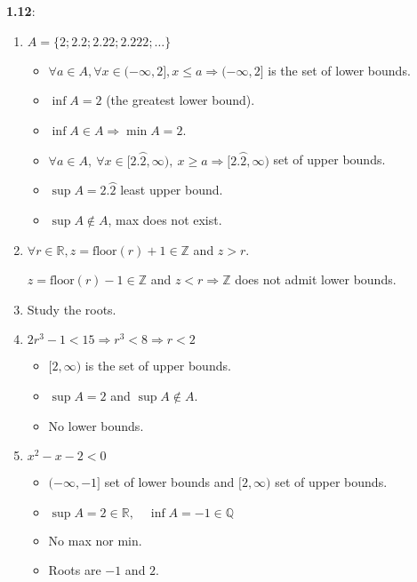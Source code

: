 \documentclass[12pt, a4paper]{book}
\begin{document}
\textbf{1.12}:
\begin{enumerate}[label=\emph{\alph*})]
  \item $A = \{2;2.2;2.22;2.222;\ldots\}$
  \begin{itemize}
    \item $\forall a\in A, \forall x\in(-\infty,2], x\leq a \Rightarrow (-\infty, 2]$ is the set of lower bounds.
    \item $\inf A=2$ (the greatest lower bound).
    \item $\inf A \in A \Rightarrow \min A = 2$.
    \item $\forall a\in A,\ \forall x\in [2.\wideparen{2}, \infty),\ x\geq a \Rightarrow [2.\wideparen{2}, \infty)$ set of upper bounds.
    \item $\sup A = 2.\wideparen{2}$ least upper bound.
    \item $\sup A \notin A$, max does not exist.
  \end{itemize}
  \item $\forall r\in\mathbb{R}, z=\text{floor}(r)+1 \in\mathbb{Z}$ and $z>r$.

  $z=\text{floor}(r)-1 \in\mathbb{Z}$ and $z<r \Rightarrow \mathbb{Z}$ does not admit lower bounds.
  \item Study the roots.
  \item $2r^3-1 < 15 \Rightarrow r^3 < 8 \Rightarrow r < 2$
  \begin{itemize}
    \item $[2,\infty)$ is the set of upper bounds.
    \item $\sup A = 2$ and $\sup A \notin A$.
    \item No lower bounds.
  \end{itemize}
  \item $x^2-x-2 < 0$
  \begin{itemize}
    \item $(-\infty,-1]$ set of lower bounds and $[2,\infty)$ set of upper bounds.
    \item $\sup A = 2\in\mathbb{R},\quad \inf A = -1\in\mathbb{Q}$
    \item No max nor min.
    \item Roots are $-1$ and $2$.
  \end{itemize}
\end{enumerate}
\end{document}
